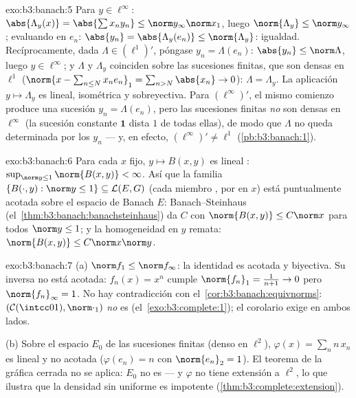 \begin{solution}{exo:b3:banach:5}
Para $y \in \ell^\infty$: $\abs{\Lambda_y(x)} =
\abs{\sum x_ny_n} \leq \norm y_\infty\norm x_1$, luego
$\norm{\Lambda_y} \leq \norm y_\infty$; evaluando en $e_n$:
$\abs{y_n} = \abs{\Lambda_y(e_n)} \leq \norm{\Lambda_y}$:
igualdad. Recíprocamente, dada $\Lambda \in (\ell^1)'$, póngase $y_n =
\Lambda(e_n)$: $\abs{y_n} \leq \norm\Lambda$, luego $y \in
\ell^\infty$; y $\Lambda$ y $\Lambda_y$ coinciden sobre las sucesiones
finitas, que son densas en $\ell^1$ ($\norm{x - \sum_{n\leq
N}x_ne_n}_1 = \sum_{n>N}\abs{x_n} \to 0$): $\Lambda =
\Lambda_y$. La aplicación $y \mapsto \Lambda_y$ es lineal, isométrica y
sobreyectiva. Para $(\ell^\infty)'$, el mismo comienzo produce una
sucesión $y_n = \Lambda(e_n)$, pero las sucesiones finitas \emph{no} son
densas en $\ell^\infty$ (la sucesión constante $\mathbf 1$ dista $1$ de
todas ellas), de modo que $\Lambda$ no queda determinada por los $y_n$
--- y, en efecto, $(\ell^\infty)' \neq \ell^1$
(\cref{pb:b3:banach:1}).
\end{solution}

\begin{solution}{exo:b3:banach:6}
Para cada $x$ fijo, $y \mapsto B(x, y)$ es lineal
:
$\sup_{\norm y \leq 1}\norm{B(x,y)} < \infty$. Así que la familia
$\{B(\cdot, y) : \norm y \leq 1\} \subseteq \mathcal L(E, G)$
(cada miembro , por
 en $x$) está
puntualmente acotada sobre el espacio de Banach $E$: Banach--Steinhaus
(el~\cref{thm:b3:banach:banachsteinhaus}) da $C$ con
$\norm{B(x,y)} \leq C\norm x$ para todos $\norm y \leq 1$; y la
homogeneidad en $y$ remata: $\norm{B(x,y)} \leq
C\norm x\norm y$.
\end{solution}

\begin{solution}{exo:b3:banach:7}
(a) $\norm f_1 \leq \norm f_\infty$: la identidad es acotada y
biyectiva. Su inversa no está acotada: $f_n(x) = x^n$ cumple
$\norm{f_n}_1 = \frac1{n+1} \to 0$ pero $\norm{f_n}_\infty = 1$. No hay
contradicción con el~\cref{cor:b3:banach:equivnorms}: $(\mathcal
C(\intcc01), \norm\cdot_1)$ \emph{no} es
(el~\cref{exo:b3:complete:1}); el corolario exige
 en ambos lados.

(b) Sobre el espacio $E_0$ de las sucesiones finitas (denso en
$\ell^2$), $\varphi(x) = \sum_n n\,x_n$ es lineal y no acotada
($\varphi(e_n) = n$ con $\norm{e_n}_2 = 1$). El teorema de la gráfica
cerrada no se aplica: $E_0$ no es
 --- y $\varphi$ no tiene
extensión  a $\ell^2$, lo
que ilustra que la densidad sin
 uniforme es impotente
(\cref{thm:b3:complete:extension}).
\end{solution}

